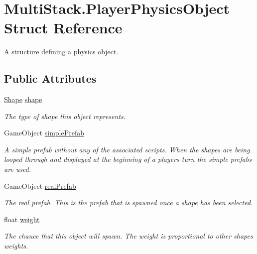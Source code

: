 \hypertarget{struct_multi_stack_1_1_player_physics_object}{}\section{Multi\+Stack.\+Player\+Physics\+Object Struct Reference}
\label{struct_multi_stack_1_1_player_physics_object}


A structure defining a physics object.  


\subsection*{Public Attributes}
\begin{DoxyCompactItemize}
\item 
\hyperlink{namespace_multi_stack_ac7f637887fea673ceeae6fdd0598c048}{Shape} \hyperlink{struct_multi_stack_1_1_player_physics_object_a7232e0e0dce8cd41a4d60977c4c6bc7b}{shape}
\begin{DoxyCompactList}\small\item\em The type of shape this object represents. \end{DoxyCompactList}\item 
Game\+Object \hyperlink{struct_multi_stack_1_1_player_physics_object_a9ea1890efae7166e3f97e09034dfd505}{simple\+Prefab}
\begin{DoxyCompactList}\small\item\em A simple prefab without any of the associated scripts. When the shapes are being looped through and displayed at the beginning of a players turn the simple prefabs are used. \end{DoxyCompactList}\item 
Game\+Object \hyperlink{struct_multi_stack_1_1_player_physics_object_a12ec933050599f2b98759c1c4ceee830}{real\+Prefab}
\begin{DoxyCompactList}\small\item\em The real prefab. This is the prefab that is spawned once a shape has been selected. \end{DoxyCompactList}\item 
float \hyperlink{struct_multi_stack_1_1_player_physics_object_a19e58a0ebb90ee69437a21f12093e758}{weight}
\begin{DoxyCompactList}\small\item\em The chance that this object will spawn. The weight is proportional to other shapes weights. \end{DoxyCompactList}\end{DoxyCompactItemize}
